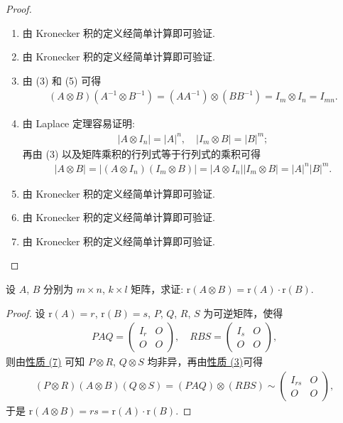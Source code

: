 \documentclass[../../main.tex]{subfiles}%
\begin{document}
\begin{proof}
\begin{enumerate}[(1)]
\item 由 Kronecker 积的定义经简单计算即可验证.

\item 由 Kronecker 积的定义经简单计算即可验证.

\item 由 (3) 和 (5) 可得
\begin{align*}
(A\otimes B)(A^{-1}\otimes B^{-1})=(AA^{-1})\otimes (BB^{-1})=I_m\otimes I_n = I_{mn}.
\end{align*}

\item 由 Laplace 定理容易证明:
\begin{align*}
|A\otimes I_n| = |A|^n, \quad |I_m\otimes B| = |B|^m;
\end{align*}
再由 (3) 以及矩阵乘积的行列式等于行列式的乘积可得
\begin{align*}
|A\otimes B| = |(A\otimes I_n)(I_m\otimes B)| = |A\otimes I_n||I_m\otimes B| = |A|^n|B|^m. 
\end{align*}

\item 由 Kronecker 积的定义经简单计算即可验证.

\item 由 Kronecker 积的定义经简单计算即可验证.

\item 由 Kronecker 积的定义经简单计算即可验证.
\end{enumerate}
\end{proof}

\begin{proposition}[矩阵的Kronecker积的秩]\label{proposition:矩阵的Kronecker积的秩}
设 $A$, $B$ 分别为 $m\times n$, $k\times l$ 矩阵，求证: $\mathrm{r}(A\otimes B)=\mathrm{r}(A)\cdot\mathrm{r}(B)$.
\end{proposition}
\begin{proof}
设 $\mathrm{r}(A)=r$, $\mathrm{r}(B)=s$, $P$, $Q$, $R$, $S$ 为可逆矩阵，使得
\begin{align*}
PAQ = \begin{pmatrix}
I_r & O \\
O & O
\end{pmatrix}, \quad RBS = \begin{pmatrix}
I_s & O \\
O & O
\end{pmatrix},
\end{align*}
则由\hyperref[矩阵的Kronecker积的基本性质(7)]{性质 (7)} 可知 $P\otimes R$, $Q\otimes S$ 均非异，再由\hyperref[矩阵的Kronecker积的基本性质(3)]{性质 (3)}可得
\begin{align*}
(P\otimes R)(A\otimes B)(Q\otimes S)=(PAQ)\otimes (RBS)\sim\begin{pmatrix}
I_{rs} & O \\
O & O
\end{pmatrix},
\end{align*}
于是 $\mathrm{r}(A\otimes B)=rs=\mathrm{r}(A)\cdot\mathrm{r}(B)$.  
\end{proof}
\end{document}
